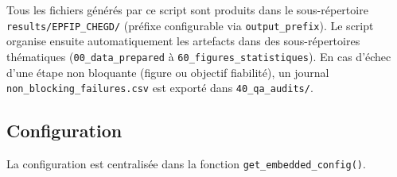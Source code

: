 \documentclass[11pt,a4paper]{article}
\begin{document}
\begin{infobox}
  Tous les fichiers générés par ce script sont produits dans le sous-répertoire
  \texttt{results/EPFIP\_CHEGD/} (préfixe configurable via \texttt{output\_prefix}).
  Le script organise ensuite automatiquement les artefacts dans des sous-répertoires
  thématiques (\texttt{00\_data\_prepared} à \texttt{60\_figures\_statistiques}).
  En cas d'échec d'une étape non bloquante (figure ou objectif fiabilité), un journal
  \texttt{non\_blocking\_failures.csv} est exporté dans \texttt{40\_qa\_audits/}.
\end{infobox}

\subsection{Configuration}
\label{sec:config}

La configuration est centralisée dans la fonction \texttt{get\_embedded\_config()}.
\end{document}
